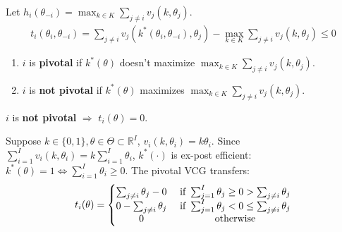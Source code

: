 \documentclass[11pt]{elegantbook}
\begin{document}
\begin{definition}
    \normalfont
    Let $h_i(\theta_{-i})=\max_{k\in K}\sum_{j\neq i}v_j(k,\theta_j)$.
    \begin{equation}
        \begin{aligned}
            t_i(\theta_i,\theta_{-i})=\sum_{j\neq i}v_j(k^*(\theta_i,\theta_{-i}),\theta_j)-\max_{k\in K}\sum_{j\neq i}v_j(k,\theta_j)\leq 0
        \end{aligned}
        \nonumber
    \end{equation}
    \begin{enumerate}
        \item $i$ is \textbf{pivotal} if $k^*(\theta)$ doesn't maximize $\max_{k\in K}\sum_{j\neq i}v_j(k,\theta_j)$.
        \item $i$ is \textbf{not pivotal} if $k^*(\theta)$ maximizes $\max_{k\in K}\sum_{j\neq i}v_j(k,\theta_j)$.
    \end{enumerate}
    \begin{note}
        $i$ is \textbf{not pivotal} $\Rightarrow$ $t_i(\theta)=0$.
    \end{note}
\end{definition}

\begin{example}
    Suppose $k\in\{0,1\}, \theta\in \Theta\subset \mathbb{R}^I$, $v_i(k,\theta_i)=k\theta_i$. Since $\sum_{i=1}^Iv_i(k,\theta_i)=k\sum_{i=1}^I\theta_i$, $k^*(\cdot)$ is ex-post efficient: $k^*(\theta)=1 \Leftrightarrow \sum_{i=1}^I\theta_i\geq 0$. The pivotal VCG transfers:
    \begin{equation}
        \begin{aligned}
            t_i(\theta)=\left\{\begin{matrix}
                \sum_{j\neq i}\theta_j-0&\textnormal{ if }\sum_{j=1}^I \theta_j\geq 0>\sum_{j\neq i}\theta_j\\
                0-\sum_{j\neq i}\theta_j&\textnormal{ if }\sum_{j=1}^I \theta_j< 0\leq\sum_{j\neq i}\theta_j\\
                0&\textnormal{ otherwise}
            \end{matrix}\right.
        \end{aligned}
        \nonumber
    \end{equation}
\end{example}
\end{document}

